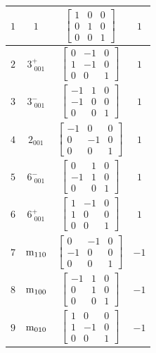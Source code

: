 \documentclass[fleqn,8pt]{jsarticle}
\begin{document}
\begin{longtable}{cccc}
$ 1 $ & $ 1 $ & $ \begin{bmatrix} 1 & 0 & 0 \\ 0 & 1 & 0 \\ 0 & 0 & 1 \end{bmatrix} $ & $ 1 $ \\ \hline
$ 2 $ & $ 3^{+}_{\,\,001} $ & $ \begin{bmatrix} 0 & -1 & 0 \\ 1 & -1 & 0 \\ 0 & 0 & 1 \end{bmatrix} $ & $ 1 $ \\ \hline
$ 3 $ & $ 3^{-}_{\,\,001} $ & $ \begin{bmatrix} -1 & 1 & 0 \\ -1 & 0 & 0 \\ 0 & 0 & 1 \end{bmatrix} $ & $ 1 $ \\ \hline
$ 4 $ & $ 2{}_{001} $ & $ \begin{bmatrix} -1 & 0 & 0 \\ 0 & -1 & 0 \\ 0 & 0 & 1 \end{bmatrix} $ & $ 1 $ \\ \hline
$ 5 $ & $ 6^{-}_{\,\,001} $ & $ \begin{bmatrix} 0 & 1 & 0 \\ -1 & 1 & 0 \\ 0 & 0 & 1 \end{bmatrix} $ & $ 1 $ \\ \hline
$ 6 $ & $ 6^{+}_{\,\,001} $ & $ \begin{bmatrix} 1 & -1 & 0 \\ 1 & 0 & 0 \\ 0 & 0 & 1 \end{bmatrix} $ & $ 1 $ \\ \hline
$ 7 $ & $ {\rm m}_{110} $ & $ \begin{bmatrix} 0 & -1 & 0 \\ -1 & 0 & 0 \\ 0 & 0 & 1 \end{bmatrix} $ & $ -1 $ \\ \hline
$ 8 $ & $ {\rm m}_{100} $ & $ \begin{bmatrix} -1 & 1 & 0 \\ 0 & 1 & 0 \\ 0 & 0 & 1 \end{bmatrix} $ & $ -1 $ \\ \hline
$ 9 $ & $ {\rm m}_{010} $ & $ \begin{bmatrix} 1 & 0 & 0 \\ 1 & -1 & 0 \\ 0 & 0 & 1 \end{bmatrix} $ & $ -1 $ \\ \hline

\end{longtable}
\end{document}
